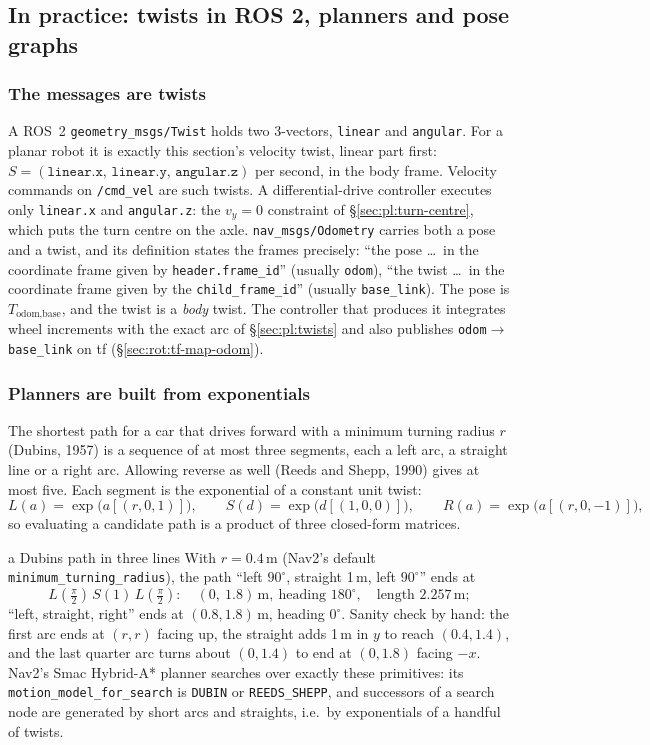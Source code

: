 \subsection{In practice: twists in ROS 2, planners and pose graphs}\label{sec:pl:in-practice}

\subsubsection{The messages are twists}
A ROS~2 \texttt{geometry\_msgs/Twist} holds two 3-vectors, \texttt{linear} and \texttt{angular}. For a planar robot it is exactly this section's velocity twist, linear part first: $S=(\texttt{linear.x},\,\texttt{linear.y},\,\texttt{angular.z})$ per second, in the body frame. Velocity commands on \texttt{/cmd\_vel} are such twists. A differential-drive controller executes only \texttt{linear.x} and \texttt{angular.z}: the $v_y=0$ constraint of \S\ref{sec:pl:turn-centre}, which puts the turn centre on the axle. \texttt{nav\_msgs/Odometry} carries both a pose and a twist, and its definition states the frames precisely: ``the pose \dots\ in the coordinate frame given by \texttt{header.frame\_id}'' (usually \texttt{odom}), ``the twist \dots\ in the coordinate frame given by the \texttt{child\_frame\_id}'' (usually \texttt{base\_link}). The pose is $T_{\text{odom},\text{base}}$, and the twist is a \emph{body} twist. The controller that produces it integrates wheel increments with the exact arc of \S\ref{sec:pl:twists} and also publishes \texttt{odom}$\to$\texttt{base\_link} on tf (\S\ref{sec:rot:tf-map-odom}).

\subsubsection{Planners are built from exponentials}
The shortest path for a car that drives forward with a minimum turning radius $r$ (Dubins, 1957) is a sequence of at most three segments, each a left arc, a straight line or a right arc. Allowing reverse as well (Reeds and Shepp, 1990) gives at most five. Each segment is the exponential of a constant unit twist:
\[
L(a)=\exp\big(a[(r,0,1)]\big),\qquad S(d)=\exp\big(d[(1,0,0)]\big),\qquad R(a)=\exp\big(a[(r,0,-1)]\big),
\]
so evaluating a candidate path is a product of three closed-form matrices.

\begin{example}{a Dubins path in three lines}
With $r=0.4$\,m (Nav2's default \texttt{minimum\_turning\_radius}), the path ``left $90^\circ$, straight 1\,m, left $90^\circ$'' ends at
\[
L(\tfrac\pi2)\,S(1)\,L(\tfrac\pi2):\quad(0,\ 1.8)\,\text{m},\ \text{heading }180^\circ,\quad\text{length }2.257\,\text{m};
\]
``left, straight, right'' ends at $(0.8,1.8)$\,m, heading $0^\circ$. Sanity check by hand: the first arc ends at $(r,r)$ facing up, the straight adds 1\,m in $y$ to reach $(0.4,1.4)$, and the last quarter arc turns about $(0,1.4)$ to end at $(0,1.8)$ facing $-x$. Nav2's Smac Hybrid-A* planner searches over exactly these primitives: its \texttt{motion\_model\_for\_search} is \texttt{DUBIN} or \texttt{REEDS\_SHEPP}, and successors of a search node are generated by short arcs and straights, i.e.\ by exponentials of a handful of twists.
\end{example}

